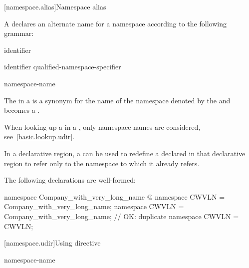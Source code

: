 [namespace.alias]{Namespace alias}%
%
%

\pnum
A  declares an alternate name for a
namespace according to the following grammar:

\begin{bnf}
\br
        identifier
\end{bnf}

\begin{bnf}
\br
         identifier \terminal{=} qualified-namespace-specifier \terminal{;}
\end{bnf}

\begin{bnf}
\br
     namespace-name
\end{bnf}

\pnum
The  in a  is
a synonym for the name of the namespace denoted by the
 and becomes a
.
\begin{note}
When looking up a  in a
, only namespace names are
considered, see~\ref{basic.lookup.udir}.
\end{note}

\pnum
In a declarative region, a  can be
used to redefine a  declared in that
declarative region to refer only to the namespace to which it already
refers.
\begin{example}
The following declarations are well-formed:

\begin{codeblock}
namespace Company_with_very_long_name { @\commentellip@ }
namespace CWVLN = Company_with_very_long_name;
namespace CWVLN = Company_with_very_long_name;  // OK: duplicate
namespace CWVLN = CWVLN;
\end{codeblock}
\end{example}

[namespace.udir]{Using directive}%

\begin{bnf}
\br
        namespace-name \terminal{;}
\end{bnf}


